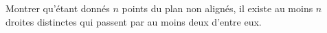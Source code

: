 Montrer qu'étant donnés $n$ points du plan non alignés, il existe au moins $n$ droites distinctes qui passent par au moins deux d'entre eux.
